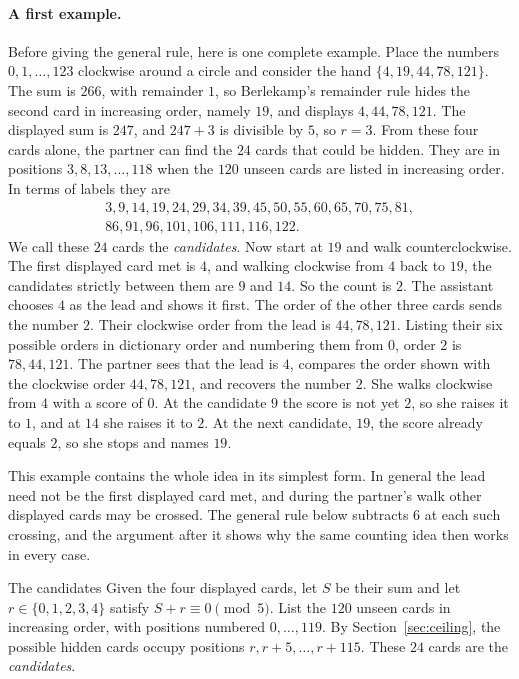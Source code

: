\documentclass[11pt]{article}
\begin{document}
\paragraph{A first example.} Before giving the general rule, here is one complete example. Place the numbers $0,1,\ldots,123$ clockwise around a circle and consider the hand $\{4,19,44,78,121\}$.
The sum is $266$, with remainder $1$, so Berlekamp's remainder rule hides the second card in increasing order, namely $19$, and displays $4,44,78,121$. 
The displayed sum is $247$, and $247+3$ is divisible by $5$, so $r=3$. From these four cards alone, the partner can find the $24$ cards that could be hidden. They are in positions $3,8,13,\ldots,118$ when the $120$ unseen cards are listed in increasing order. In terms of labels they are
$$
\begin{aligned}
3,9,14,19,24,29,34,39,45,50,55,60,65,70,75,81,\\
86,91,96,101,106,111,116,122.
\end{aligned}
$$
We call these $24$ cards the \emph{candidates}. Now start at $19$ and walk counterclockwise. The first displayed card met is $4$, and walking clockwise from $4$ back to $19$, the candidates strictly between them are $9$ and $14$. So the count is $2$. 
The assistant chooses $4$ as the lead and shows it first. The order of the other three cards sends the number $2$. Their clockwise order from the lead is $44,78,121$. Listing their six possible orders in dictionary order and numbering them from $0$, order $2$ is $78,44,121$.
The partner sees that the lead is $4$, compares the order shown with the clockwise order $44,78,121$, and recovers the number $2$. She walks clockwise from $4$ with a score of $0$. At the candidate $9$ the score is not yet $2$, so she raises it to $1$, and at $14$ she raises it to $2$. At the next candidate, $19$, the score already equals $2$, so she stops and names $19$.

This example contains the whole idea in its simplest form. In general the lead need not be the first displayed card met, and during the partner's walk other displayed cards may be crossed. The general rule below subtracts $6$ at each such crossing, and the argument after it shows why the same counting idea then works in every case.
\begin{rulebox}{The candidates}
Given the four displayed cards, let $S$ be their sum and let $r\in\{0,1,2,3,4\}$ satisfy $S+r\equiv0\pmod5$. List the $120$ unseen cards in increasing order, with positions numbered $0,\ldots,119$. By Section~\ref{sec:ceiling}, the possible hidden cards occupy positions $r,r+5,\ldots,r+115$. These $24$ cards are the \emph{candidates}.
\end{rulebox}
\end{document}

